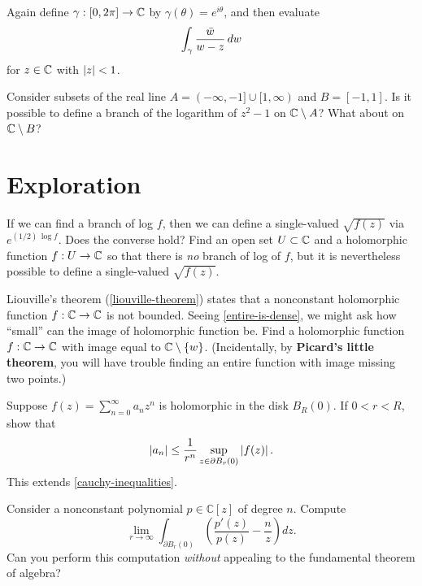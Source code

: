 \documentclass{homework}
\begin{document}
\begin{problem}
  Again define $\gamma : [0,2\pi] \to \mathbb{C}$ by
  $\gamma(\theta) = e^{i\theta}$, and then evaluate
  \[
    \int_\gamma \frac{\bar{w}}{w - z} \, dw
  \] for $z \in \mathbb{C}$ with $\left|z\right| < 1$.
\end{problem}

\begin{problem}
  Consider subsets of the real line $A = (-\infty,-1] \cup [1,\infty)$
  and $B = [-1,1]$.  Is it possible to define a branch of the
  logarithm of $z^2 - 1$ on $\mathbb{C} \setminus A$?  What about on
  $\mathbb{C} \setminus B$?
\end{problem}

\section{Exploration}

\begin{problem}
  If we can find a branch of log $f$, then we can define a
  single-valued $\sqrt{f(z)}$ via $e^{(1/2) \, \log f}$.  Does the
  converse hold?  Find an open set $U \subset \mathbb{C}$ and a holomorphic
  function $f : U \to \mathbb{C}$ so that there is \textit{no} branch of log
  of $f$, but it is nevertheless possible to define a single-valued
  $\sqrt{f(z)}$.
\end{problem}

\begin{problem}
  Liouville's theorem (\ref{liouville-theorem}) states that a
  nonconstant holomorphic function $f : \mathbb{C} \to \mathbb{C}$ is not bounded.
  Seeing \ref{entire-is-dense}, we might ask how ``small'' can the
  image of holomorphic function be.  Find a holomorphic function
  $f : \mathbb{C} \to \mathbb{C}$ with image equal to $\mathbb{C} \setminus \{w\}$.
  (Incidentally, by \textbf{Picard's little theorem}, you will have
  trouble finding an entire function with image missing two points.)
\end{problem}

\begin{problem}\label{cauchy-inequalities-2}Suppose
  $f(z) = \sum_{n=0}^\infty a_n z^n$ is holomorphic in the disk
  $B_R(0)$.  If $0 < r < R$, show that
  \[
    \left|a_n\right| \leq \frac{1}{r^n} \displaystyle\sup_{z \in \partial B_r(0)} \left|f(z)\right|.
  \]
  This extends \ref{cauchy-inequalities}.
\end{problem}

\begin{problem}
  Consider a nonconstant polynomial $p \in \mathbb{C}[z]$ of degree $n$.  Compute
  \[
    \lim_{r \to \infty} \int_{\partial B_r(0)} \left( \frac{p'(z)}{p(z)} - \frac{n}{z} \right) dz.
  \]
  Can you perform this computation \textit{without} appealing to the
  fundamental theorem of algebra?
\end{problem}
\end{document}
